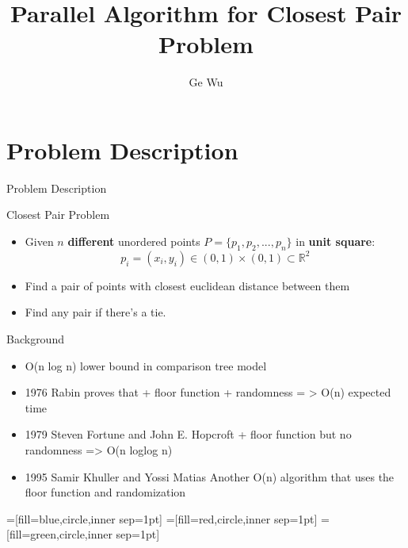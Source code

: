 \documentclass[18pt]{beamer}
\title[Parallel Algorithm for Closest Pair Problem]{Parallel Algorithm for Closest Pair Problem}
\subtitle{}
\author{Ge Wu}
\institute{Institute for Theoretical Informatics}
\def \loose {15pt}
\begin{document}

\begin{frame}
\titlepage
\end{frame}


\section{Problem Description}

\begin{frame}{Problem Description}
\begin{block}{Closest Pair Problem}
\begin{itemize}
\item Given $n$ \textbf{different} unordered points $P = \{p_1,p_2, ... ,p_n\}$ in \textbf{unit square}: \\
$$p_i = (x_i, y_i) \in (0, 1) \times (0,1) \subset \mathbb{R}^2$$
\item Find a pair of points with closest euclidean distance between them
\item Find any pair if there's a tie.
\end{itemize}
\end{block}
\end{frame}

\begin{frame}{Background}
\begin{itemize}
	\setlength{\itemsep}{\loose}
	\item O(n log n) lower bound in comparison tree model
	\item 1976  Rabin proves that + floor function + randomness = > O(n) expected time
 	\item 1979  Steven Fortune and John E. Hopcroft + floor function but no randomness => O(n loglog n)
 	\item 1995  Samir Khuller and Yossi Matias Another O(n) algorithm that uses the floor function and randomization
\end{itemize}
\end{frame}

=[fill=blue,circle,inner sep=1pt]
=[fill=red,circle,inner sep=1pt]
=[fill=green,circle,inner sep=1pt]
\end{document}
